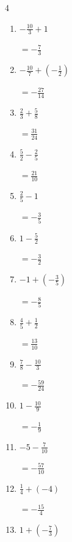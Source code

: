 \begin{multicols}{4}
\begin{enumerate}
  \item $\displaystyle -\frac{10}{3} + 1$

        $\displaystyle =-\frac{7}{3}$

  \item $\displaystyle -\frac{10}{7} + \left(-\frac{1}{2}\right)$

        $\displaystyle =-\frac{27}{14}$

  \item $\displaystyle \frac{2}{3} + \frac{5}{8}$

        $\displaystyle =\frac{31}{24}$

  \item $\displaystyle \frac{5}{2} - \frac{2}{5}$

        $\displaystyle =\frac{21}{10}$

\columnbreak %

  \item $\displaystyle \frac{2}{5} - 1$

        $\displaystyle =-\frac{3}{5}$

  \item $\displaystyle 1 - \frac{5}{2}$

        $\displaystyle =-\frac{3}{2}$

  \item $\displaystyle -1 + \left(-\frac{3}{5}\right)$

        $\displaystyle =-\frac{8}{5}$

  \item $\displaystyle \frac{4}{5} + \frac{1}{2}$

        $\displaystyle =\frac{13}{10}$

  \item $\displaystyle \frac{7}{8} - \frac{10}{3}$

        $\displaystyle =-\frac{59}{24}$

  \item $\displaystyle 1 - \frac{10}{9}$

        $\displaystyle =-\frac{1}{9}$

  \item $\displaystyle -5 - \frac{7}{10}$

        $\displaystyle =-\frac{57}{10}$

  \item $\displaystyle \frac{1}{4} + \left(-4\right)$

        $\displaystyle =-\frac{15}{4}$

  \item $\displaystyle 1 + \left(-\frac{7}{3}\right)$


\end{enumerate}
\end{multicols}
